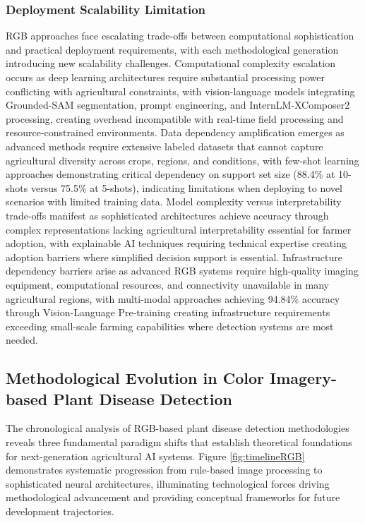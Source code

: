 \documentclass[sn-mathphys]{sn-jnl}
\theoremstyle{thmstyleone}%
\theoremstyle{thmstyletwo}%
\theoremstyle{thmstylethree}%
\begin{document}
\subsubsection{Deployment Scalability Limitation}
RGB approaches face escalating trade-offs between computational sophistication and practical deployment requirements, with each methodological generation introducing new scalability challenges. Computational complexity escalation occurs as deep learning architectures require substantial processing power conflicting with agricultural constraints, with vision-language models \citep{zhang2024visual} integrating Grounded-SAM segmentation, prompt engineering, and InternLM-XComposer2 processing, creating overhead incompatible with real-time field processing and resource-constrained environments. Data dependency amplification emerges as advanced methods require extensive labeled datasets that cannot capture agricultural diversity across crops, regions, and conditions, with few-shot learning approaches \citep{uskaner2024efficient} demonstrating critical dependency on support set size (88.4\% at 10-shots versus 75.5\% at 5-shots), indicating limitations when deploying to novel scenarios with limited training data. Model complexity versus interpretability trade-offs manifest as sophisticated architectures achieve accuracy through complex representations lacking agricultural interpretability essential for farmer adoption, with explainable AI techniques \citep{bhandari2023botanicx} requiring technical expertise creating adoption barriers where simplified decision support is essential. Infrastructure dependency barriers arise as advanced RGB systems require high-quality imaging equipment, computational resources, and connectivity unavailable in many agricultural regions, with multi-modal approaches \citep{cao2023cucumber} achieving 94.84\% accuracy through Vision-Language Pre-training creating infrastructure requirements exceeding small-scale farming capabilities where detection systems are most needed.

\subsection{Methodological Evolution in Color Imagery-based Plant Disease Detection}

The chronological analysis of RGB-based plant disease detection methodologies reveals three fundamental paradigm shifts that establish theoretical foundations for next-generation agricultural AI systems. Figure \ref{fig:timelineRGB} demonstrates systematic progression from rule-based image processing to sophisticated neural architectures, illuminating technological forces driving methodological advancement and providing conceptual frameworks for future development trajectories.
\end{document}
